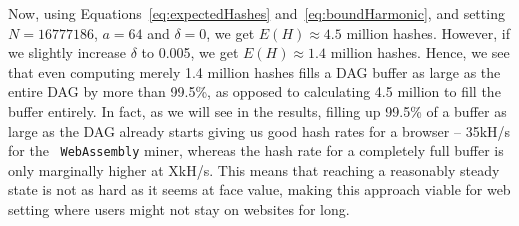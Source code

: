 \documentclass[runningheads]{llncs}
\newcommand{\trishita}[1]{{\color{magenta}\bfseries[Trishita: #1]}}
\begin{document}
Now, using Equations~\ref{eq:expectedHashes} and~\ref{eq:boundHarmonic}, and setting $N = 16777186$, $a = 64$ and $\delta = 0$, we get $E(H) \approx 4.5$ million hashes. However, if we slightly increase $\delta$ to 0.005, we get $E(H) \approx 1.4$ million hashes. Hence, we see that even computing merely 1.4 million hashes fills a DAG buffer as large as the entire DAG by more than 99.5\%, as opposed to calculating 4.5 million to fill the buffer entirely. 
In fact, as we will see in the results, filling up 99.5\% of a buffer as large as the DAG already starts giving us good hash rates for a browser -- 35kH/s for the ~\verb|WebAssembly| miner, whereas the hash rate for a completely full buffer is only marginally higher at XkH/s. 
This means that reaching a reasonably steady state is not as hard as it seems at face value, making this approach viable for web setting where users might not stay on websites for long. 



\end{document}
